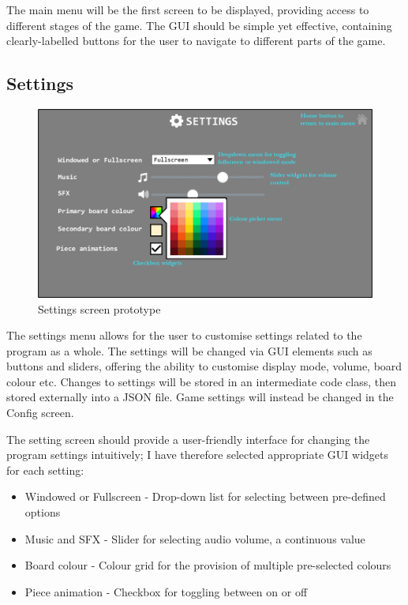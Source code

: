 \documentclass[../main/main.tex]{subfiles}
\begin{document}
The main menu will be the first screen to be displayed, providing access to different stages of the game. The GUI should be simple yet effective, containing clearly-labelled buttons for the user to navigate to different parts of the game.

\subsection{Settings}
\begin{figure}[H]
    \centering
    \includegraphics[width=0.8\columnwidth]{../design/assets/settings_gui.png}
    \caption{Settings screen prototype}
    \label{fig:settings-gui}
\end{figure}

The settings menu allows for the user to customise settings related to the program as a whole. The settings will be changed via GUI elements such as buttons and sliders, offering the ability to customise display mode, volume, board colour etc. Changes to settings will be stored in an intermediate code class, then stored externally into a JSON file. Game settings will instead be changed in the Config screen.

The setting screen should provide a user-friendly interface for changing the program settings intuitively; I have therefore selected appropriate GUI widgets for each setting:

\begin{itemize}
\item Windowed or Fullscreen - Drop-down list for selecting between pre-defined options
\item Music and SFX - Slider for selecting audio volume, a continuous value
\item Board colour - Colour grid for the provision of multiple pre-selected colours
\item Piece animation - Checkbox for toggling between on or off
\end{itemize}
\end{document}
